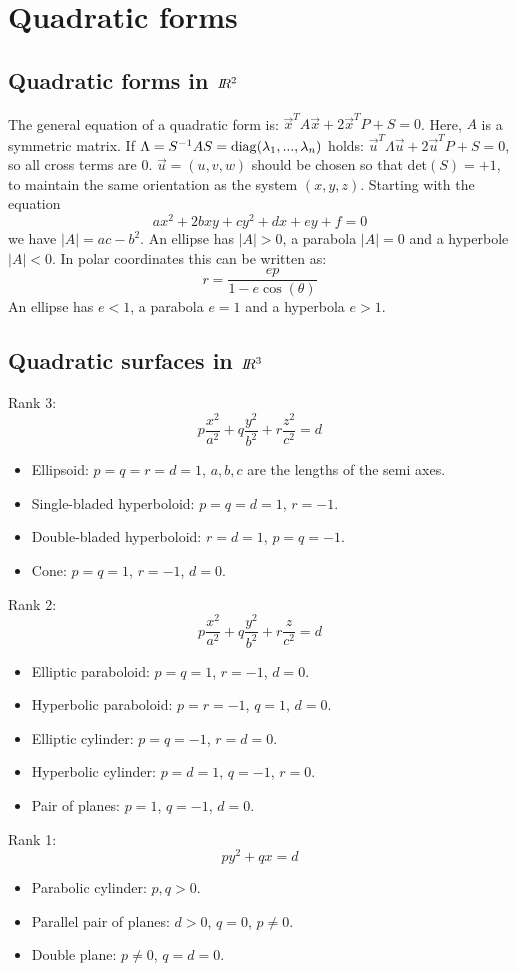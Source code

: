\documentclass[twoside]{report}
\begin{document}
\section{Quadratic forms}
\subsection{Quadratic forms in $I\hspace{-1mm}R^2$}
The general equation of a quadratic form is:
$\vec{x}^TA\vec{x}+2\vec{x}^TP+S=0$. Here, $A$ is a symmetric matrix.
If $\Lambda=S^{-1}AS={\rm diag}(\lambda_1,...,\lambda_n)$ holds:
$\vec{u}^T\Lambda\vec{u}+2\vec{u}^TP+S=0$, so all cross terms are 0.
$\vec{u}=(u,v,w)$ should be chosen so that det$(S)=+1$,
to maintain the same orientation as the system $(x,y,z)$.
\npar
Starting with the equation
\[
ax^2+2bxy+cy^2+dx+ey+f=0
\]
we have $|A|=ac-b^2$. An ellipse has $|A|>0$, a parabola $|A|=0$ and
a hyperbole $|A|<0$. In polar coordinates this can be written as:
\[
r=\frac{ep}{1-e\cos(\theta)}
\]
An ellipse has $e<1$, a parabola $e=1$ and a hyperbola $e>1$.

\subsection{Quadratic surfaces in $I\hspace{-1mm}R^3$}
Rank 3:
\[
p\frac{x^2}{a^2}+q\frac{y^2}{b^2}+r\frac{z^2}{c^2}=d
\]
\begin{itemize}
\item Ellipsoid: $p=q=r=d=1$, $a,b,c$ are the lengths of the semi axes.
\item Single-bladed hyperboloid: $p=q=d=1$, $r=-1$.
\item Double-bladed hyperboloid: $r=d=1$, $p=q=-1$.
\item Cone: $p=q=1$, $r=-1$, $d=0$.
\end{itemize}
Rank 2:
\[
p\frac{x^2}{a^2}+q\frac{y^2}{b^2}+r\frac{z}{c^2}=d
\]
\begin{itemize}
\item Elliptic paraboloid: $p=q=1$, $r=-1$, $d=0$.
\item Hyperbolic paraboloid: $p=r=-1$, $q=1$, $d=0$.
\item Elliptic cylinder: $p=q=-1$, $r=d=0$.
\item Hyperbolic cylinder: $p=d=1$, $q=-1$, $r=0$.
\item Pair of planes: $p=1$, $q=-1$, $d=0$.
\end{itemize}
Rank 1:
\[
py^2+qx=d
\]
\begin{itemize}
\item Parabolic cylinder: $p,q>0$.
\item Parallel pair of planes: $d>0$, $q=0$, $p\neq 0$.
\item Double plane: $p\neq 0$, $q=d=0$.
\end{itemize}
\end{document}
